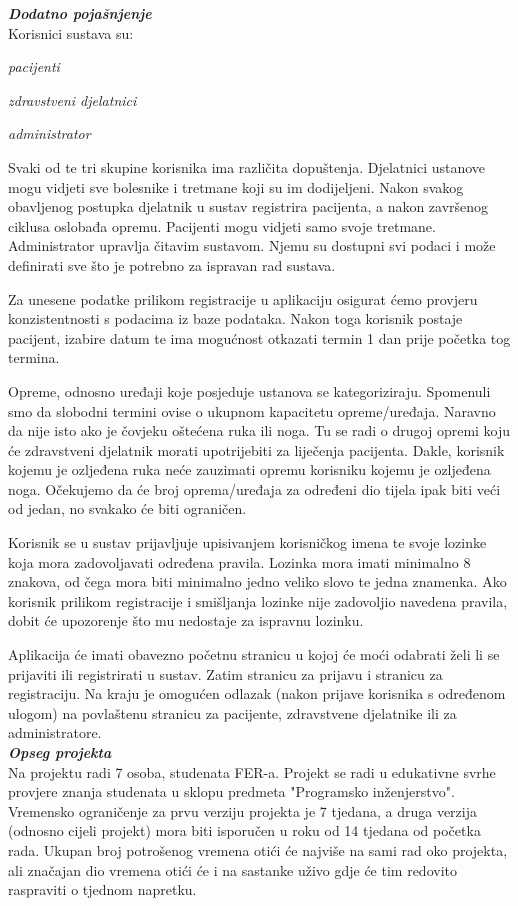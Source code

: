 \textbf{\textit{Dodatno pojašnjenje}}\\

Korisnici sustava su:

\begin{packed_item}
	\item \textit{pacijenti}
	\item \textit{zdravstveni djelatnici}
	\item \textit{administrator}
\end{packed_item}

Svaki od te tri skupine korisnika ima različita dopuštenja. Djelatnici ustanove mogu vidjeti sve bolesnike i tretmane koji su im dodijeljeni. Nakon svakog obavljenog postupka djelatnik u sustav registrira pacijenta, a nakon završenog ciklusa oslobađa opremu. Pacijenti mogu vidjeti samo svoje tretmane. Administrator upravlja čitavim sustavom. Njemu su dostupni svi podaci i može definirati sve što je potrebno za ispravan rad sustava.

Za unesene podatke prilikom registracije u aplikaciju osigurat ćemo provjeru konzistentnosti s podacima iz baze podataka. Nakon toga korisnik postaje pacijent, izabire datum te ima mogućnost otkazati termin 1 dan prije početka tog termina.

Opreme, odnosno uređaji koje posjeduje ustanova se kategoriziraju. Spomenuli smo da slobodni termini ovise o ukupnom kapacitetu opreme/uređaja. Naravno da nije isto ako je čovjeku oštećena ruka ili noga. Tu se radi o drugoj opremi koju će zdravstveni djelatnik morati upotrijebiti za liječenja pacijenta. Dakle, korisnik kojemu je ozljeđena ruka neće zauzimati opremu korisniku kojemu je ozljeđena noga. Očekujemo da će broj oprema/uređaja za određeni dio tijela ipak biti veći od jedan, no svakako će biti ograničen.

Korisnik se u sustav prijavljuje upisivanjem korisničkog imena te svoje lozinke koja mora zadovoljavati određena pravila. Lozinka mora imati minimalno 8 znakova, od čega mora biti minimalno jedno veliko slovo te jedna znamenka. Ako korisnik prilikom registracije i smišljanja lozinke nije zadovoljio navedena pravila, dobit će upozorenje što mu nedostaje za ispravnu lozinku.

Aplikacija će imati obavezno početnu stranicu u kojoj će moći odabrati želi li se prijaviti ili registrirati u sustav. Zatim stranicu za prijavu i stranicu za registraciju. Na kraju je omogućen odlazak (nakon prijave korisnika s određenom ulogom) na povlaštenu stranicu za pacijente, zdravstvene djelatnike ili za administratore. \\

\textbf{\textit{Opseg projekta}}\\

Na projektu radi 7 osoba, studenata FER-a. Projekt se radi u edukativne svrhe provjere znanja studenata u sklopu predmeta "Programsko inženjerstvo". Vremensko ograničenje za prvu verziju projekta je 7 tjedana, a druga verzija (odnosno cijeli projekt) mora biti isporučen u roku od 14 tjedana od početka rada. Ukupan broj potrošenog vremena otići će najviše na sami rad oko projekta, ali značajan dio vremena otići će i na sastanke uživo gdje će tim redovito raspraviti o tjednom napretku.

\eject